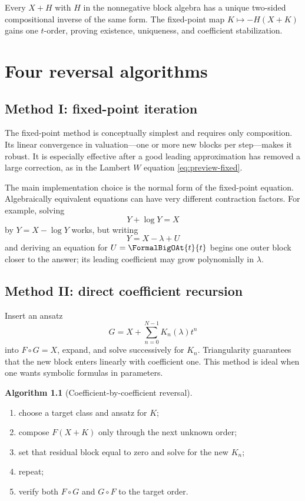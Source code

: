 \documentclass[11pt,openany]{book}
\theoremstyle{definition}
\newtheorem{algorithm}{Algorithm}[chapter]
\theoremstyle{plain}
\theoremstyle{remark}
\begin{document}
\begin{summarybox}
Every \(X+H\) with \(H\) in the nonnegative block algebra has a unique two-sided compositional inverse of the same form. The fixed-point map \(K\mapsto-H(X+K)\) gains one \(t\)-order, proving existence, uniqueness, and coefficient stabilization.
\end{summarybox}

\chapter{Four reversal algorithms}\label{ch:reversal-algorithms}

\section{Method I: fixed-point iteration}
The fixed-point method is conceptually simplest and requires only composition. Its linear convergence in valuation---one or more new blocks per step---makes it robust. It is especially effective after a good leading approximation has removed a large correction, as in the Lambert \(W\) equation \cref{eq:preview-fixed}.

The main implementation choice is the normal form of the fixed-point equation. Algebraically equivalent equations can have very different contraction factors. For example, solving
\[
 Y+\log Y=X
\]
by \(Y=X-\log Y\) works, but writing
\[
 Y=X-\lambda+U
\]
and deriving an equation for \(U=\FormalBigOAt{t}{t}\) begins one outer block closer to the answer; its leading coefficient may grow polynomially in \(\lambda\).

\section{Method II: direct coefficient recursion}
Insert an ansatz
\[
 G=X+\sum_{n=0}^{N-1}K_n(\lambda)t^n
\]
into \(F\circ G=X\), expand, and solve successively for \(K_n\). Triangularity guarantees that the new block enters linearly with coefficient one. This method is ideal when one wants symbolic formulas in parameters.

\begin{algorithm}[Coefficient-by-coefficient reversal]\label{alg:coefficient-reversal}
\begin{enumerate}
\item choose a target class and ansatz for \(K\);
\item compose \(F(X+K)\) only through the next unknown order;
\item set that residual block equal to zero and solve for the new \(K_n\);
\item repeat;
\item verify both \(F\circ G\) and \(G\circ F\) to the target order.
\end{enumerate}
\end{algorithm}
\end{document}
